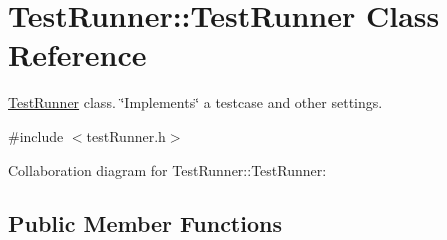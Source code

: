 \hypertarget{classTestRunner_1_1TestRunner}{}\section{Test\+Runner\+::Test\+Runner Class Reference}
\label{classTestRunner_1_1TestRunner}


\mbox{\hyperlink{classTestRunner_1_1TestRunner}{Test\+Runner}} class. \char`\"{}\+Implements\char`\"{} a testcase and other settings.  




{\ttfamily \#include $<$test\+Runner.\+h$>$}



Collaboration diagram for Test\+Runner\+::Test\+Runner\+:
\subsection*{Public Member Functions}
